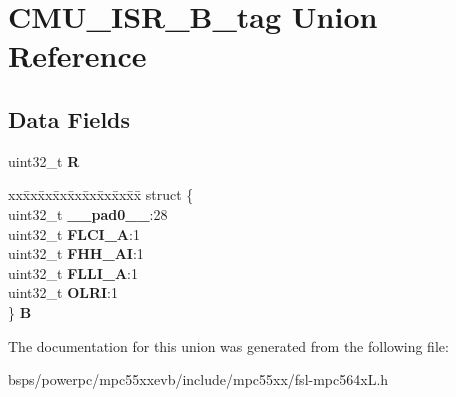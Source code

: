 \hypertarget{unionCMU__ISR__32B__tag}{}\section{C\+M\+U\+\_\+\+I\+S\+R\+\_\+B\+\_\+tag Union Reference}
\label{unionCMU__ISR__32B__tag}
\subsection*{Data Fields}
\begin{DoxyCompactItemize}
\item 
\mbox{\label{unionCMU__ISR__32B__tag_a0534c582e3cf6cd6941cc2fb1d1f6e99}} 
uint32\+\_\+t {\bfseries R}
\item 
\mbox{\label{unionCMU__ISR__32B__tag_a324003b0ea16590d3fca65d16b750ebf}} 
\begin{tabbing}
xx\=xx\=xx\=xx\=xx\=xx\=xx\=xx\=xx\=\kill
struct \{\\
\>uint32\_t {\bfseries \_\_pad0\_\_}:28\\
\>uint32\_t {\bfseries FLCI\_A}:1\\
\>uint32\_t {\bfseries FHH\_AI}:1\\
\>uint32\_t {\bfseries FLLI\_A}:1\\
\>uint32\_t {\bfseries OLRI}:1\\
\} {\bfseries B}\\

\end{tabbing}\end{DoxyCompactItemize}


The documentation for this union was generated from the following file\+:\begin{DoxyCompactItemize}
\item 
bsps/powerpc/mpc55xxevb/include/mpc55xx/fsl-\/mpc564x\+L.\+h\end{DoxyCompactItemize}
